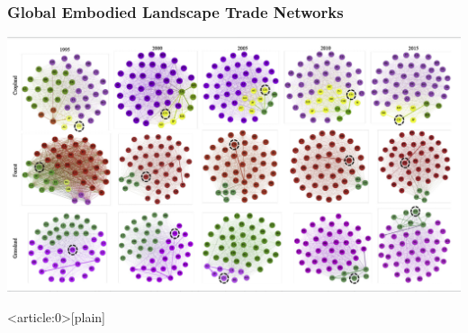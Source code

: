 \documentclass[aspectratio=169]{beamer}
\begin{document}
\begin{frame}
  \frametitle{Global Embodied Landscape Trade Networks}
  \begin{center}
  \includegraphics[width=1.0\textwidth]{images/Tian_2019_Fig3.png}
  \end{center}
\end{frame}

{ %
    \begin{frame}<article:0>[plain]
      \frametitle{}
     \end{frame}
}
\end{document}
